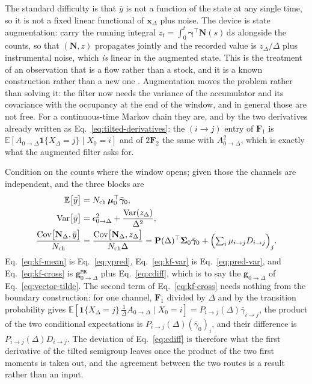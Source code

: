 \begin{appendixbox}
The standard difficulty is that $\bar y$ is not a function of the state at any single time, so it
is not a fixed linear functional of $\mathbf{x}_\Delta$ plus noise. The device is
state augmentation: carry the running integral
$z_t=\int_0^{t}\boldsymbol{\gamma}^\top\mathbf{N}(s)\,\mathrm{d}s$ alongside the counts, so that
$(\mathbf{N},z)$ propagates jointly and the recorded value is $z_\Delta/\Delta$ plus instrumental
noise, which \emph{is} linear in the augmented state. This is the treatment of an observation that
is a flow rather than a stock, and it is a known construction rather than a new one
\citep{zadrozny1988gaussian}. Augmentation moves the problem rather than solving it: the filter now
needs the variance of the accumulator and its covariance with the occupancy at the end of the
window, and in general those are not free. For a continuous-time Markov chain they are, and by the
two derivatives already written as Eq.~\ref{eq:tilted-derivatives}: the $(i\to j)$ entry of
$\mathbf{F}_1$ is $\mathbb{E}[A_{0\to\Delta}\mathbf{1}\{X_\Delta=j\}\mid X_0=i]$ and of
$2\mathbf{F}_2$ the same with $A^2_{0\to\Delta}$, which is exactly what the augmented filter asks for.

Condition on the counts where the window opens; given those the channels are independent, and the
three blocks are
\begin{align}
  \mathbb{E}\bigl[\bar y\bigr] &= N_{\mathrm{ch}}\,\boldsymbol{\mu}_0^\top\bar{\boldsymbol{\gamma}}_0,
  \label{eq:kf-mean}\\
  \mathrm{Var}\bigl[\bar y\bigr] &= \epsilon^2_{0\to\Delta} + \frac{\mathrm{Var}(z_\Delta)}{\Delta^2},
  \label{eq:kf-var}\\
  \frac{\mathrm{Cov}\bigl[\mathbf{N}_\Delta,\bar y\bigr]}{N_{\mathrm{ch}}}
    &= \frac{\mathrm{Cov}\bigl[\mathbf{N}_\Delta,z_\Delta\bigr]}{N_{\mathrm{ch}}\Delta}
    = \mathbf{P}(\Delta)^\top\boldsymbol{\Sigma}_0\bar{\boldsymbol{\gamma}}_0
      + \Bigl(\textstyle\sum_{i}\mu_{i\to j}D_{i\to j}\Bigr)_{j} .
  \label{eq:kf-cross}
\end{align}
Eq.~\ref{eq:kf-mean} is Eq.~\ref{eq:ypred}, Eq.~\ref{eq:kf-var} is Eq.~\ref{eq:pred-var}, and
Eq.~\ref{eq:kf-cross} is $\mathbf{g}^{\mathtt{MR}}_{0\to\Delta}$ plus Eq.~\ref{eq:cdiff}, which is to say the
$\mathbf{g}_{0\to\Delta}$ of Eq.~\ref{eq:vector-tilde}. The second term of Eq.~\ref{eq:kf-cross} needs nothing
from the boundary construction: for one channel, $\mathbf{F}_1$ divided by $\Delta$ and by the
transition probability gives
$\mathbb{E}[\mathbf{1}\{X_\Delta=j\}\,\tfrac{1}{\Delta}A_{0\to\Delta}\mid X_0=i]
= P_{i\to j}(\Delta)\bar{\gamma}_{i\to j}$, the product of the two conditional
expectations is $P_{i\to j}(\Delta)(\bar\gamma_0)_{i}$, and their difference is
$P_{i\to j}(\Delta)D_{i\to j}$. The deviation of Eq.~\ref{eq:cdiff} is therefore what the
first derivative of the tilted semigroup leaves once the product of the two first moments is taken
out, and the agreement between the two routes is a result rather than an input.


\end{appendixbox}
